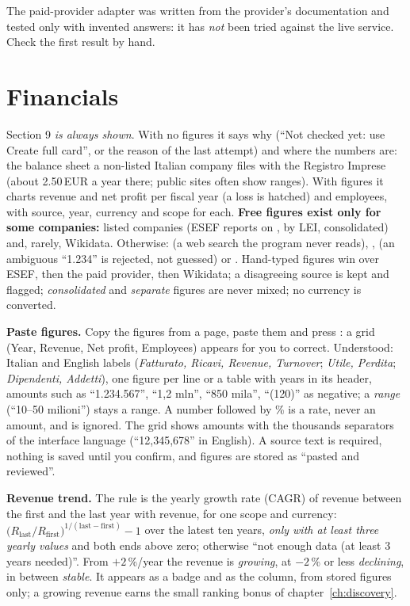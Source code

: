 \begin{warnbox}
The paid-provider adapter was written from the provider's documentation and tested only with invented answers: it has
\emph{not} been tried against the live service. Check the first result by hand.
\end{warnbox}

\section{Financials}
Section 9 \emph{is always shown}. With no figures it says why (``Not checked yet: use Create full card'', or the
reason of the last attempt) and where the numbers are: the balance sheet a non-listed Italian company files with the
Registro Imprese (about 2.50\,EUR a year there; public sites often show ranges). With figures it charts revenue and
net profit per fiscal year (a loss is hatched) and employees, with source, year, currency and scope for each.
\textbf{Free figures exist only for some companies:} listed companies (ESEF reports on ,
by LEI, consolidated) and, rarely, Wikidata. Otherwise:  (a web search the
program never reads), ,  (an ambiguous ``1.234'' is
rejected, not guessed) or . Hand-typed figures win over ESEF, then the paid provider,
then Wikidata; a disagreeing source is kept and flagged; \emph{consolidated} and \emph{separate} figures are never
mixed; no currency is converted.

\textbf{Paste figures.} Copy the figures from a page, paste them and press : a grid (Year,
Revenue, Net profit, Employees) appears for you to correct. Understood: Italian and English labels (\emph{Fatturato,
Ricavi, Revenue, Turnover}; \emph{Utile, Perdita}; \emph{Dipendenti, Addetti}), one figure per line or a table with
years in its header, amounts such as ``1.234.567'', ``1,2 mln'', ``850 mila'', ``(120)'' as negative; a \emph{range}
(``10--50 milioni'') stays a range. A number followed by \% is a rate, never an amount, and is ignored. The grid shows amounts with the thousands separators of the interface language (``12,345,678'' in English). A source text is required, nothing is saved until you confirm, and figures are
stored as ``pasted and reviewed''.

\textbf{Revenue trend.}\label{sec:trend} The rule is the yearly growth rate (CAGR) of revenue between the first and
the last year with revenue, for one scope and currency:
$\bigl(R_{\mathrm{last}}/R_{\mathrm{first}}\bigr)^{1/(\mathrm{last}-\mathrm{first})}-1$ over the latest ten years,
\emph{only with at least three yearly values} and both ends above zero; otherwise ``not enough data (at least 3 years
needed)''. From $+2$\,\%/year the revenue is \emph{growing}, at $-2$\,\% or less \emph{declining}, in between
\emph{stable}. It appears as a badge and as the  column, from stored figures only; a growing revenue
earns the small ranking bonus of chapter~\ref{ch:discovery}.

